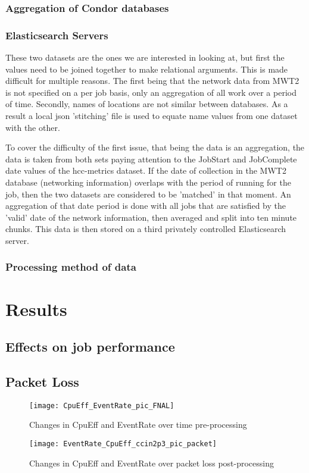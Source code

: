 \documentclass[]{scrartcl}
\begin{document}
\subsubsection{Aggregation of Condor databases}
\subsubsection{Elasticsearch Servers}
These two datasets are the ones we are interested in looking at, but first the values need to be joined together to make relational arguments. This is made difficult for multiple reasons. The first being that the network data from MWT2 is not specified on a per job basis, only an aggregation of all work over a period of time. Secondly, names of locations are not similar between databases. As a result a local json 'stitching' file is used to equate name values from one dataset with the other. 

To cover the difficulty of the first issue, that being the data is an aggregation, the data is taken from both sets paying attention to the JobStart and JobComplete date values of the hcc-metrics dataset. If the date of collection in the MWT2 database (networking information) overlaps with the period of running for the job, then the two datasets are considered to be 'matched' in that moment. An aggregation of that date period is done with all jobs that are satisfied by the 'valid' date of the network information, then averaged and split into ten minute chunks. This data is then stored on a third privately controlled Elasticsearch server.
\subsubsection{Processing method of data}
\section{Results}
\subsection{Effects on job performance}
\subsection{Packet Loss}
\begin{figure}
	\caption{Changes in CpuEff and EventRate over time pre-processing}
	\centering
	\texttt{[image: CpuEff\_EventRate\_pic\_FNAL]}
\end{figure}
\begin{figure}
	\caption{Changes in CpuEff and EventRate over packet loss post-processing}
	\centering
	\texttt{[image: EventRate\_CpuEff\_ccin2p3\_pic\_packet]}
\end{figure}
\end{document}

